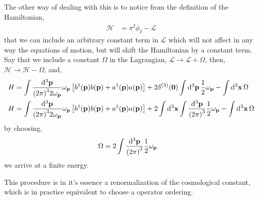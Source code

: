 The other way of dealing with this is to notice from the definition of the Hamiltonian,
\begin{align}
    \mathcal H  &= \pi^I\dot{ \phi_I} - \mathcal L
\end{align}
that we can include an arbitrary constant term in $\mathcal L$ which will not affect in any way the equations of motion, but will shift the Hamiltonian by a constant term. Say that we include a constant $\Omega$ in the 
Lagrangian, $\mathcal L \rightarrow \mathcal L +\Omega$, then, $\mathcal H\rightarrow \mathcal H-\Omega$, and,
\begin{align}
    H&=\int\frac{\dd[3]{\vb p}}{\qty(2\pi)^32\omega_{\vb p}}\omega_{\vb p}\left[b^\dagger\qty(\vb p)b\qty(\vb p)+ a^\dagger\qty(\vb p)a\qty(\vb p)\right]+2\delta^{\qty(3)}\qty(\vb 0)\int\dd[3]{\vb p}\frac12\omega_{\vb p}-\int\dd[3]{\vb x}\Omega\\
    H&=\int\frac{\dd[3]{\vb p}}{\qty(2\pi)^32\omega_{\vb p}}\omega_{\vb p}\left[b^\dagger\qty(\vb p)b\qty(\vb p)+ a^\dagger\qty(\vb p)a\qty(\vb p)\right]+2\int\dd[3]{\vb x}\int\frac{\dd[3]{\vb p}}{\qty(2\pi)^3}\frac12\omega_{\vb p}-\int\dd[3]{\vb x}\Omega
\end{align}
by choosing, 
\begin{align}
    \Omega&=2\int\frac{\dd[3]{\vb p}}{\qty(2\pi)^3}\frac12\omega_{\vb p}
\end{align}
we arrive at a finite energy. 

This procedure is in it's essence a renormalization of the cosmological constant, which is in practice equivalent to choose a operator ordering.

